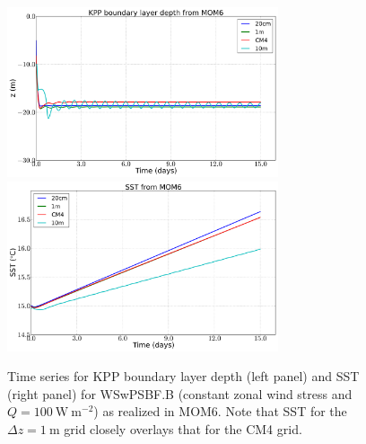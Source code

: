 \begin{figure}[h!t]
\begin{center}
\includegraphics[angle=0,width=8cm]{./figs/MOM6/WSwPSBF_B_MOM6_KPP_bldepth.png}
\includegraphics[angle=0,width=8cm]{./figs/MOM6/WSwPSBF_B_MOM6_SST.png}
\caption[KPP boundary layer depth and SST from MOM6 for WSwPSBF.B]
{\sf Time series for KPP boundary layer depth (left panel) and SST
  (right panel) for WSwPSBF.B (constant zonal wind stress and
  $Q=100~\mbox{W}~\mbox{m}^{-2}$) as realized in MOM6.  Note that SST
  for the $\Delta z = 1~\mbox{m}$ grid closely overlays that for the
  CM4 grid.}
\label{fig:WSwPSBF_B_MOM6_SST_bldepth}
\end{center}
\end{figure}


